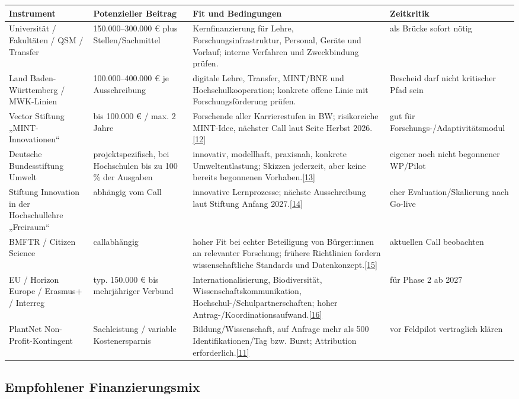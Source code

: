 \documentclass[10pt,a4paper,oneside]{article}
\newcommand{\Src}[1]{\hyperlink{src:#1}{\textcolor{Forest}{[#1]}}}
\begin{document}
\begin{longtable}{@{}p{36mm}p{28mm}p{52mm}p{40mm}@{}}
\toprule
\textbf{Instrument} & \textbf{Potenzieller Beitrag} & \textbf{Fit und Bedingungen} & \textbf{Zeitkritik} \\
\midrule
\endhead
Universität / Fakultäten / QSM / Transfer & 150.000--300.000 € plus Stellen/Sachmittel & Kernfinanzierung für Lehre, Forschungsinfrastruktur, Personal, Geräte und Vorlauf; interne Verfahren und Zweckbindung prüfen. & als Brücke sofort nötig \\
Land Baden-Württemberg / MWK-Linien & 100.000--400.000 € je Ausschreibung & digitale Lehre, Transfer, MINT/BNE und Hochschulkooperation; konkrete offene Linie mit Forschungsförderung prüfen. & Bescheid darf nicht kritischer Pfad sein \\
Vector Stiftung „MINT-Innovationen“ & bis 100.000 € / max. 2 Jahre & Forschende aller Karrierestufen in BW; risikoreiche MINT-Idee, nächster Call laut Seite Herbst 2026.\Src{12} & gut für Forschungs-/Adaptivitätsmodul \\
Deutsche Bundesstiftung Umwelt & projektspezifisch, bei Hochschulen bis zu 100\,\% der Ausgaben & innovativ, modellhaft, praxisnah, konkrete Umweltentlastung; Skizzen jederzeit, aber keine bereits begonnenen Vorhaben.\Src{13} & eigener noch nicht begonnener WP/Pilot \\
Stiftung Innovation in der Hochschullehre „Freiraum“ & abhängig vom Call & innovative Lernprozesse; nächste Ausschreibung laut Stiftung Anfang 2027.\Src{14} & eher Evaluation/Skalierung nach Go-live \\
BMFTR / Citizen Science & callabhängig & hoher Fit bei echter Beteiligung von Bürger:innen an relevanter Forschung; frühere Richtlinien fordern wissenschaftliche Standards und Datenkonzept.\Src{15} & aktuellen Call beobachten \\
EU / Horizon Europe / Erasmus+ / Interreg & typ. 150.000 € bis mehrjähriger Verbund & Internationalisierung, Biodiversität, Wissenschaftskommunikation, Hochschul-/Schulpartnerschaften; hoher Antrag-/Koordinationsaufwand.\Src{16} & für Phase 2 ab 2027 \\
PlantNet Non-Profit-Kontingent & Sachleistung / variable Kostenersparnis & Bildung/Wissenschaft, auf Anfrage mehr als 500 Identifikationen/Tag bzw. Burst; Attribution erforderlich.\Src{11} & vor Feldpilot vertraglich klären \\
\bottomrule
\end{longtable}

\subsection{Empfohlener Finanzierungsmix}
\end{document}
